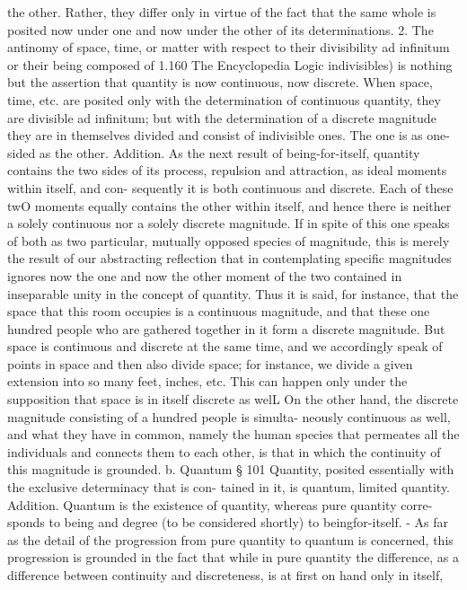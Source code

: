 {the other. Rather, they differ only in virtue of the fact that the same
whole is posited now under one and now under the other of its
determinations. 2. The antinomy of space, time, or matter {with
respect to their divisibility ad infinitum or their being composed of
1.160
The Encyclopedia Logic
indivisibles) is nothing but the assertion that quantity is now
continuous, now discrete. When space, time, etc. are posited only
with the determination of continuous quantity, they are divisible ad
infinitum; but with the determination of a discrete magnitude they
are in themselves divided and consist of indivisible ones. The one
is as one-sided as the other.
Addition. As the next result of being-for-itself, quantity contains the two sides
of its process, repulsion and attraction, as ideal moments within itself, and con-
sequently it is both continuous and discrete. Each of these twO moments equally
contains the other within itself, and hence there is neither a solely continuous nor
a solely discrete magnitude. If in spite of this one speaks of both as two particular,
mutually opposed species of magnitude, this is merely the result of our abstracting
reflection that in contemplating specific magnitudes ignores now the one and now
the other moment of the two contained in inseparable unity in the concept of
quantity. Thus it is said, for instance, that the space that this room occupies is
a continuous magnitude, and that these one hundred people who are gathered
together in it form a discrete magnitude. But space is continuous and discrete at
the same time, and we accordingly speak of points in space and then also divide
space; for instance, we divide a given extension into so many feet, inches, etc. This
can happen only under the supposition that space is in itself discrete as welL On
the other hand, the discrete magnitude consisting of a hundred people is simulta-
neously continuous as well, and what they have in common, namely the human
species that permeates all the individuals and connects them to each other, is that
in which the continuity of this magnitude is grounded.
b. Quantum
§ 101
Quantity, posited essentially with the exclusive determinacy that is con-
tained in it, is quantum, limited quantity.
Addition. Quantum is the existence of quantity, whereas pure quantity corre-
sponds to being and degree (to be considered shortly) to beingfor-itself. - As far
as the detail of the progression from pure quantity to quantum is concerned, this
progression is grounded in the fact that while in pure quantity the difference, as
a difference between continuity and discreteness, is at first on hand only in itself,
}}
